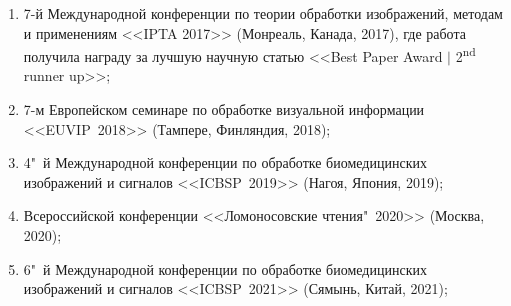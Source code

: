 \begin {enumerate}[beginpenalty=10000]
	\item 7-й Международной конференции по теории обработки изображений, методам и применениям <<IPTA 2017>> (Монреаль, Канада, 2017), где работа получила награду за лучшую научную статью <<Best Paper Award $\mid$ 2\textsuperscript{nd} runner up>>;
	
	\item 7-м Европейском семинаре по обработке визуальной информации <<EUVIP~2018>> (Тампере, Финляндия, 2018);
	
	\item 4"~й Международной конференции по обработке биомедицинских изображений и сигналов <<ICBSP~2019>> (Нагоя, Япония, 2019);
	
	\item Всероссийской конференции <<Ломоносовские чтения"~2020>> (Москва, 2020);
	
	\item 6"~й Международной конференции по обработке биомедицинских изображений и сигналов <<ICBSP~2021>> (Сямынь, Китай, 2021);
\end {enumerate}

